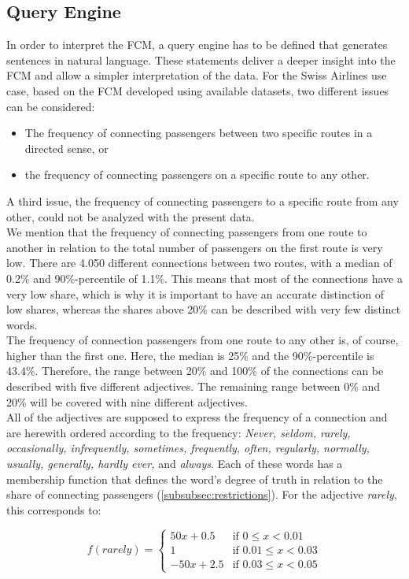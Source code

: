 \documentclass[conference]{IEEEtran}
\begin{document}
\subsection{Query Engine}
\label{subsec:queryengine}
In order to interpret the FCM, a query engine has to be defined that generates sentences in natural language. These statements deliver a deeper insight into the FCM and allow a simpler interpretation of the data. For the Swiss Airlines use case, based on the FCM developed using available datasets, two different issues can be considered: 
\begin{itemize}
\item The frequency of connecting passengers between two specific routes in a directed sense, or
\item the frequency of connecting passengers on a specific route to any other.
\end{itemize}
A third issue, the frequency of connecting passengers to a specific route from any other, could not be analyzed with the present data.\\
We mention that the frequency of connecting passengers from one route to another in relation to the total number of passengers on the first route is very low. There are 4.050 different connections between two routes, with a median of 0.2\% and 90\%-percentile of 1.1\%. This means that most of the connections have a very low share, which is why it is important to have an accurate distinction of low shares, whereas the shares above 20\% can be described with very few distinct words.\\
The frequency of connection passengers from one route to any other is, of course, higher than the first one. Here, the median is 25\% and the 90\%-percentile is 43.4\%. Therefore, the range between 20\% and 100\% of the connections can be described with five different adjectives. The remaining range between 0\% and 20\% will be covered with nine different adjectives.\\
All of the adjectives are supposed to express the frequency of a connection and are herewith ordered according to the frequency: \emph{Never, seldom, rarely, occasionally, infrequently, sometimes, frequently, often, regularly, normally, usually, generally, hardly ever,} and \emph{always}. Each of these words has a membership function that defines the word's degree of truth in relation to the share of connecting passengers (\ref{subsubsec:restrictions}). For the adjective \emph{rarely}, this corresponds to:

\begin{equation}
f(rarely)= \begin{cases}
50x + 0.5 & \text{if } 0 \leqslant x < 0.01\\
1 & \text{if } 0.01 \leqslant x < 0.03\\
-50x + 2.5 & \text{if } 0.03 \leqslant x < 0.05
\end{cases}
\end{equation}
\end{document}
